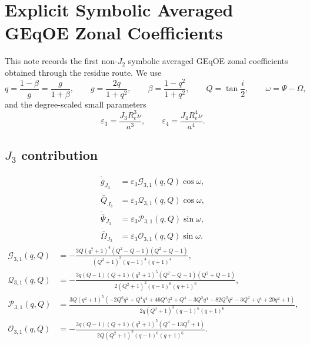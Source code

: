 \documentclass[10pt]{article}
\begin{document}
\small
\section*{Explicit Symbolic Averaged GEqOE Zonal Coefficients}
This note records the first non-$J_2$ symbolic averaged GEqOE zonal coefficients obtained through the residue route.
We use
\begin{equation}
q = \frac{1-\beta}{g} = \frac{g}{1+\beta}, \qquad
g = \frac{2q}{1+q^2}, \qquad
\beta = \frac{1-q^2}{1+q^2}, \qquad
Q=\tan\frac{i}{2}, \qquad
\omega = \Psi - \Omega,
\end{equation}
and the degree-scaled small parameters
\begin{equation}
\varepsilon_3 = \frac{J_{3} R_{e}^{3} \nu}{a^{3}}, \qquad \varepsilon_4 = \frac{J_{4} R_{e}^{4} \nu}{a^{4}}.
\end{equation}

\subsection*{$J_3$ contribution}
\begin{align}
\dot{\bar g}_{J_3} &= \varepsilon_3 \mathcal{G}_{3,1}(q,Q)\cos\omega,\\
\dot{\bar Q}_{J_3} &= \varepsilon_3 \mathcal{Q}_{3,1}(q,Q)\cos\omega,\\
\dot{\bar\Psi}_{J_3} &= \varepsilon_3 \mathcal{P}_{3,1}(q,Q)\sin\omega,\\
\dot{\bar\Omega}_{J_3} &= \varepsilon_3 \mathcal{O}_{3,1}(q,Q)\sin\omega.
\end{align}
\begingroup\footnotesize
\begin{align}
\mathcal{G}_{3,1}(q,Q) &= - \frac{3 Q \left(q^{2} + 1\right)^{4} \left(Q^{2} - Q - 1\right) \left(Q^{2} + Q - 1\right)}{\left(Q^{2} + 1\right)^{3} \left(q - 1\right)^{4} \left(q + 1\right)^{4}},\\
\mathcal{Q}_{3,1}(q,Q) &= - \frac{3 q \left(Q - 1\right) \left(Q + 1\right) \left(q^{2} + 1\right)^{5} \left(Q^{2} - Q - 1\right) \left(Q^{2} + Q - 1\right)}{2 \left(Q^{2} + 1\right)^{2} \left(q - 1\right)^{6} \left(q + 1\right)^{6}},\\
\mathcal{P}_{3,1}(q,Q) &= \frac{3 Q \left(q^{2} + 1\right)^{5} \left(- 2 Q^{6} q^{2} + Q^{4} q^{4} + 46 Q^{4} q^{2} + Q^{4} - 3 Q^{2} q^{4} - 82 Q^{2} q^{2} - 3 Q^{2} + q^{4} + 20 q^{2} + 1\right)}{2 q \left(Q^{2} + 1\right)^{3} \left(q - 1\right)^{6} \left(q + 1\right)^{6}},\\
\mathcal{O}_{3,1}(q,Q) &= - \frac{3 q \left(Q - 1\right) \left(Q + 1\right) \left(q^{2} + 1\right)^{5} \left(Q^{4} - 13 Q^{2} + 1\right)}{2 Q \left(Q^{2} + 1\right)^{2} \left(q - 1\right)^{6} \left(q + 1\right)^{6}}.
\end{align}
\endgroup
\end{document}
